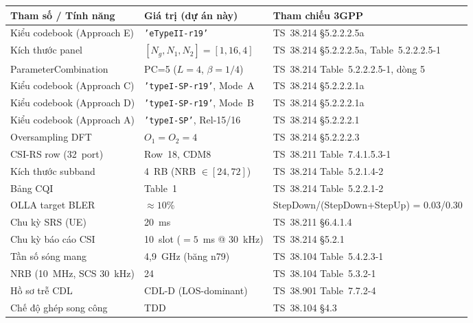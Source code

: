 \documentclass[12pt, a4paper]{article}
\begin{document}
\begin{center}
\begin{longtable}{L{4.5cm} L{3.8cm} L{5.5cm}}
\toprule
\textbf{Tham số / Tính năng} & \textbf{Giá trị (dự án này)} &
\textbf{Tham chiếu 3GPP} \\
\midrule
\endhead
\bottomrule
\endfoot
Kiểu codebook (Approach E)  & \texttt{'eTypeII-r19'}         &
  TS~38.214 \S5.2.2.2.5a \\[2pt]
Kích thước panel             & $[N_g,N_1,N_2]=[1,16,4]$       &
  TS~38.214 \S5.2.2.2.5a, Table~5.2.2.2.5-1 \\[2pt]
ParameterCombination         & PC=5 ($L=4$, $\beta=1/4$)      &
  TS~38.214 Table~5.2.2.2.5-1, dòng 5 \\[2pt]
Kiểu codebook (Approach C)   & \texttt{'typeI-SP-r19'}, Mode~A &
  TS~38.214 \S5.2.2.2.1a \\[2pt]
Kiểu codebook (Approach D)   & \texttt{'typeI-SP-r19'}, Mode~B &
  TS~38.214 \S5.2.2.2.1a \\[2pt]
Kiểu codebook (Approach A)   & \texttt{'typeI-SP'}, Rel-15/16  &
  TS~38.214 \S5.2.2.2.1 \\[2pt]
Oversampling DFT             & $O_1 = O_2 = 4$                &
  TS~38.214 \S5.2.2.2.3 \\[2pt]
CSI-RS row (32~port)         & Row~18, CDM8                   &
  TS~38.211 Table~7.4.1.5.3-1 \\[2pt]
Kích thước subband           & 4~RB (NRB $\in [24,72]$)       &
  TS~38.214 Table~5.2.1.4-2 \\[2pt]
Bảng CQI                     & Table~1                        &
  TS~38.214 Table~5.2.2.1-2 \\[2pt]
OLLA target BLER             & $\approx 10\%$                 &
  StepDown/(StepDown+StepUp) = 0.03/0.30 \\[2pt]
Chu kỳ SRS (UE)              & 20~ms                          &
  TS~38.211 \S6.4.1.4 \\[2pt]
Chu kỳ báo cáo CSI           & 10~slot ($= 5$~ms @ 30~kHz)   &
  TS~38.214 \S5.2.1 \\[2pt]
Tần số sóng mang             & 4,9~GHz (băng n79)             &
  TS~38.104 Table~5.4.2.3-1 \\[2pt]
NRB (10~MHz, SCS 30~kHz)     & 24                             &
  TS~38.104 Table~5.3.2-1 \\[2pt]
Hồ sơ trễ CDL                & CDL-D (LOS-dominant)           &
  TS~38.901 Table~7.7.2-4 \\[2pt]
Chế độ ghép song công        & TDD                            &
  TS~38.104 \S4.3 \\
\end{longtable}
\label{tab:spec}
\end{center}
\end{document}
